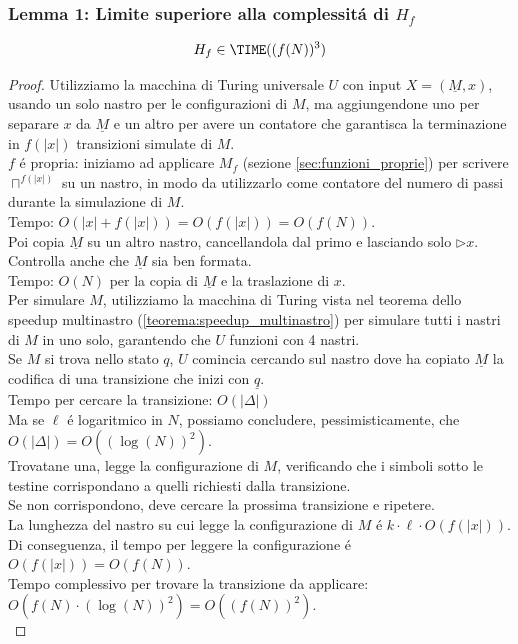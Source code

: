 \subsubsection{Lemma 1: Limite superiore alla complessitá di $H_f$}
\[H_f \in \TIME((f(N))^3)\]
\begin{proof}
Utilizziamo la macchina di Turing universale $U$ con input $X = (\underline{M}, x)$, usando un solo nastro per le configurazioni di $M$,
ma aggiungendone uno per separare $x$ da $\underline{M}$ 
e un altro per avere un contatore che garantisca la terminazione 
in $f(|x|)$ transizioni simulate di $M$. \\

$f$ é propria: iniziamo ad applicare $M_f$ (sezione \ref{sec:funzioni_proprie}) per scrivere $\sqcap^{f(|x|)}$ su un nastro, 
in modo da utilizzarlo come contatore del numero di passi durante la simulazione di $M$. \\
Tempo: $O(|x| + f(|x|)) = O(f(|x|)) = O(f(N))$. \\

Poi copia $\underline{M}$ su un altro nastro, cancellandola dal primo e lasciando solo $\triangleright x$. \\
Controlla anche che $\underline{M}$ sia ben formata. \\
Tempo: $O(N)$ per la copia di $\underline{M}$ e la traslazione di $x$. \\

Per simulare $M$, utilizziamo la macchina di Turing vista nel teorema dello speedup multinastro (\ref{teorema:speedup_multinastro}) 
per simulare tutti i nastri di $M$ in uno solo, garantendo che $U$ funzioni con 4 nastri. \\

Se $M$ si trova nello stato $q$, $U$ comincia cercando sul nastro dove ha copiato $\underline{M}$ la codifica di una transizione che inizi con $\underline{q}$.\\
Tempo per cercare la transizione: $O(|\Delta|)$ \\
Ma se $\ell$ é logaritmico in $N$, possiamo concludere, pessimisticamente, che 
$O(|\Delta|) = O((\log(N))^2)$. \\

Trovatane una, legge la configurazione di $M$, verificando che i simboli sotto le testine corrispondano a quelli richiesti dalla transizione. \\
Se non corrispondono, deve cercare la prossima transizione e ripetere. \\
La lunghezza del nastro su cui legge la configurazione di $M$ é $k \cdot \ell \cdot O(f(|x|))$.
Di conseguenza, il tempo per leggere la configurazione é $O(f(|x|)) = O(f(N))$.\\
Tempo complessivo per trovare la transizione da applicare: $O(f(N) \cdot (\log(N))^2) = O((f(N))^2)$.\\


\end{proof}
